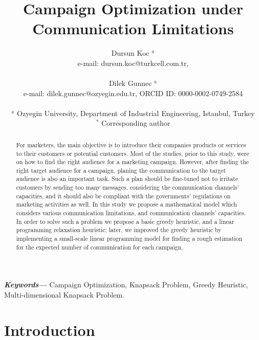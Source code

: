 \documentclass[11pt]{article}
\title{Campaign Optimization under Communication Limitations \\}
\author{Dursun Koc $^{a}$ \\ 
	e-mail: dursun.koc@turkcell.com.tr, \\\\
	Dilek Gunnec $^{a}$ \\ 
	e-mail: dilek.gunnec@ozyegin.edu.tr, ORCID ID: 0000-0002-0749-2584 \\\\
$^{a}$ Ozyegin University, Department of Industrial Engineering, Istanbul, Turkey \\ 
$^{\ast}$ Corresponding author \\ }
\date{}
\providecommand{\keywords}[1]
{
  \small	
  \textbf{\textit{Keywords---}} #1
}
\begin{document}
\maketitle
\begin{abstract}
For marketers, the main objective is to introduce their companies products or services to their customers or potential customers. Most of the studies, prior to this study, were on how to find the right audience for a marketing campaign. However, after finding the right target audience for a campaign, planing the communication to the target audience is also an important task. Such a plan should be fine-tuned not to irritate customers by sending too many messages, considering the communication channels' capacities, and it should also be compliant with the governments' regulations on marketing activities as well. In this study we propose a mathematical model which considers various communication limitations, and communication channels' capacities. In order to solve such a problem we propose a basic greedy heuristic, and a linear programming relaxation heuristic; later, we improved the greedy heuristic by implementing a small-scale linear programming model for finding a rough estimation for the expected number of communication for each campaign.\end{abstract}\hspace{10pt}

\keywords{Campaign Optimization, Knapsack Problem, Greedy Heuristic, Multi-dimensional Knapsack Problem.}

\newpage

\section{Introduction}
\end{document}
